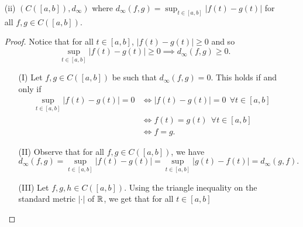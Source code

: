 \documentclass[a4paper]{article}
\begin{document}
\begin{problem}
\begin{enumerate}
\begin{proof}
\begin{enumerate}
                Thus, 
                \[  | {x}_{i} - {z}_{i} |  \leq \max_{1 \leq i \leq n } | {x}_{i}- {y}_{i} |  + \max_{1 \leq i \leq n} | {y}_{i} - {z}_{i} |. \tag{1}  \]
                Notice that the right-hand side above is an upper bound for the set 
                \[  \{ 1 \leq i \leq n : | {x}_{i} - {z}_{i} |  \}. \]
                Thus, (1) implies that 
                \[  \max_{1 \leq i \leq n} | {x}_{i} - {z}_{i} | \leq \max_{1 \leq i \leq n } | {x}_{i}- {y}_{i} |  + \max_{1 \leq i \leq n} | {y}_{i} - {z}_{i} |.  \]
                By definition of \( {d}_{\infty } \), we obtain 
                \[  {d}_{\infty }(x,z) \leq {d}_{\infty }(x,y) + {d}_{\infty }(y,z). \]

            \end{enumerate}
            From (I) - (III), we can conclude that \( (\R^{n}, {d}_{\infty })  \) is a metric space.
           \end{proof}
       \item[(ii)] \( (C([a,b]), {d}_{\infty }) \) where \( {d}_{\infty }(f,g) = \sup_{t \in [a,b]} | f(t) - g(t) |  \) for all  \( f,g \in C([a,b]) \).
           \begin{proof}
               Notice that for all \( t \in [a,b]  \), \( | f(t) - g(t) |  \geq 0  \) and so 
               \[ \sup_{t \in [a,b]} | f(t) - g(t) |  \geq 0 \implies {d}_{\infty} (f,g) \geq 0.  \]
               \begin{enumerate}
                   \item[(I)] Let \( f,g \in  C([a,b]) \) be such that \( {d}_{\infty}(f,g) = 0  \). This holds if and only if
                       \begin{align*}
                           \sup_{t \in [a,b]} | f(t) - g(t) |  = 0 &\iff | f(t) - g(t) |  = 0 \ \ \forall t \in [a,b] \\
                                                                   &\iff f(t) = g(t) \ \ \forall t \in [a,b] \\
                                                                   &\iff f = g.
                       \end{align*}
                   \item[(II)] Observe that for all \( f,g \in C([a,b]) \), we have   
                       \[ {d}_{\infty }(f,g) = \sup_{t \in [a,b]} | f(t) - g(t) |  = \sup_{t \in [a,b]} | g(t) - f(t) |  = {d}_{\infty }(g,f). \]
                   \item[(III)] Let \( f,g,h \in C([a,b]) \). Using the triangle inequality on the standard metric \( | \cdot |  \) of \( \mathbb{R}  \), we get that for all \( t \in [a,b] \)

\end{enumerate}
\end{proof}
\end{enumerate}
\end{problem}
\end{document}
